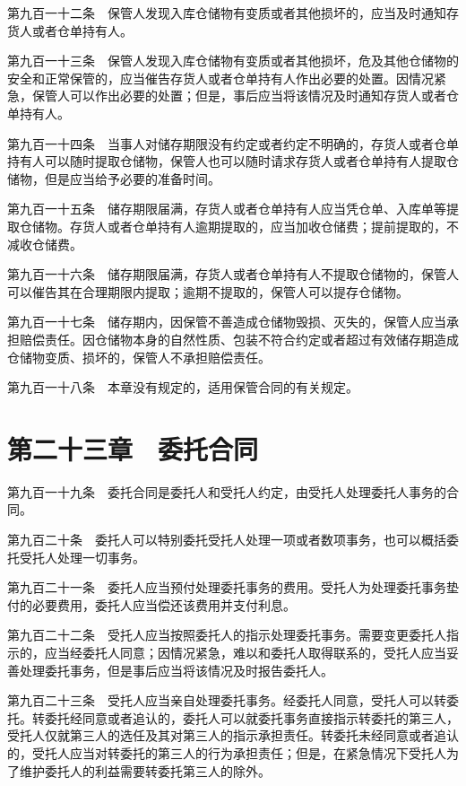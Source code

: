 \documentclass[UTF8,12pt,a4paper]{ctexbook}
\begin{document}
第九百一十二条　保管人发现入库仓储物有变质或者其他损坏的，应当及时通知存货人或者仓单持有人。

第九百一十三条　保管人发现入库仓储物有变质或者其他损坏，危及其他仓储物的安全和正常保管的，应当催告存货人或者仓单持有人作出必要的处置。因情况紧急，保管人可以作出必要的处置；但是，事后应当将该情况及时通知存货人或者仓单持有人。

第九百一十四条　当事人对储存期限没有约定或者约定不明确的，存货人或者仓单持有人可以随时提取仓储物，保管人也可以随时请求存货人或者仓单持有人提取仓储物，但是应当给予必要的准备时间。

第九百一十五条　储存期限届满，存货人或者仓单持有人应当凭仓单、入库单等提取仓储物。存货人或者仓单持有人逾期提取的，应当加收仓储费；提前提取的，不减收仓储费。

第九百一十六条　储存期限届满，存货人或者仓单持有人不提取仓储物的，保管人可以催告其在合理期限内提取；逾期不提取的，保管人可以提存仓储物。

第九百一十七条　储存期内，因保管不善造成仓储物毁损、灭失的，保管人应当承担赔偿责任。因仓储物本身的自然性质、包装不符合约定或者超过有效储存期造成仓储物变质、损坏的，保管人不承担赔偿责任。

第九百一十八条　本章没有规定的，适用保管合同的有关规定。

\section*{第二十三章　委托合同}

第九百一十九条　委托合同是委托人和受托人约定，由受托人处理委托人事务的合同。

第九百二十条　委托人可以特别委托受托人处理一项或者数项事务，也可以概括委托受托人处理一切事务。

第九百二十一条　委托人应当预付处理委托事务的费用。受托人为处理委托事务垫付的必要费用，委托人应当偿还该费用并支付利息。

第九百二十二条　受托人应当按照委托人的指示处理委托事务。需要变更委托人指示的，应当经委托人同意；因情况紧急，难以和委托人取得联系的，受托人应当妥善处理委托事务，但是事后应当将该情况及时报告委托人。

第九百二十三条　受托人应当亲自处理委托事务。经委托人同意，受托人可以转委托。转委托经同意或者追认的，委托人可以就委托事务直接指示转委托的第三人，受托人仅就第三人的选任及其对第三人的指示承担责任。转委托未经同意或者追认的，受托人应当对转委托的第三人的行为承担责任；但是，在紧急情况下受托人为了维护委托人的利益需要转委托第三人的除外。
\end{document}
